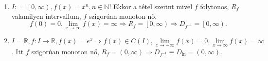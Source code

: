 \documentclass[12pt,a4paper]{scrartcl}
\providecommand{\tightlist}{%
  \setlength{\itemsep}{0pt}\setlength{\parskip}{0pt}}
\begin{document}
\begin{enumerate}
\def\labelenumi{\arabic{enumi}.}
\tightlist
\item
  \(I: = \left\lbrack {0,\infty} \right),f\left( x \right) = x^{n},n \in {\mathbb{N}}\)!
  Ekkor a tétel szerint mivel \(f\) folytonos, \(R_{f}\) valamilyen
  intervallum, \(f\) szigorúan monoton nő,
  \[\left. f\left( 0 \right) = 0,\underset{x\rightarrow\infty}{\lim}f\left( x \right) = \infty\Rightarrow R_{f} = \left\lbrack {0,\infty} \right)\Rightarrow D_{f^{- 1}} = {\left\lbrack {0,\infty} \right).} \right.\]
\item
  \(\left. I = {\mathbb{R}},f:I\rightarrow{\mathbb{R}},f\left( x \right) = e^{x}\Rightarrow f\left( x \right) \in C\left( I \right),\underset{x\rightarrow - \infty}{\lim}f\left( x \right) = 0,\underset{x\rightarrow\infty}{\lim}f\left( x \right) = \infty \right.\).
  Itt \(f\) szigorúan monoton nő,
  \(\left. R_{f} = \left( {0,\infty} \right)\Rightarrow D_{f^{- 1}} \equiv D_{\ln} = \left( {0,\infty} \right) \right.\).
\end{enumerate}
\end{document}
